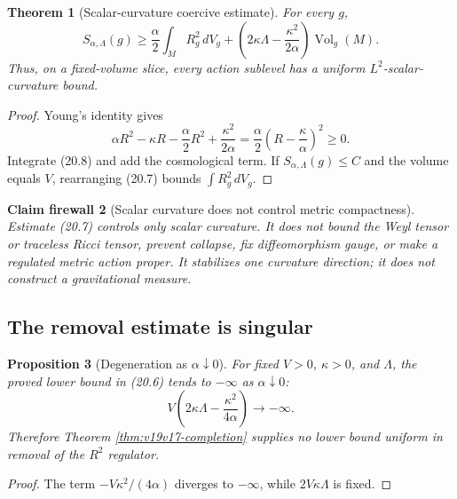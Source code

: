 \documentclass[11pt]{article}
\newtheorem{theorem}{Theorem}[section]
\newtheorem{proposition}[theorem]{Proposition}
\newtheorem{firewall}[theorem]{Claim firewall}
\theoremstyle{remark}
\begin{document}
\begin{theorem}[Scalar-curvature coercive estimate]
\label{thm:v19v17-coercive}
For every \(g\),
\[
 S_{\alpha,\Lambda}(g)
 \geq
 \frac{\alpha}{2}\int_MR_g^2\,dV_g
 +
 \left(2\kappa\Lambda-\frac{\kappa^2}{2\alpha}\right)
 \operatorname{Vol}_g(M).                                     \tag{20.7}
\]
Thus, on a fixed-volume slice, every action sublevel has a uniform
\(L^2\)-scalar-curvature bound.
\end{theorem}

\begin{proof}
Young's identity gives
\[
 \alpha R^2-\kappa R
 -\frac{\alpha}{2}R^2+\frac{\kappa^2}{2\alpha}
 =\frac{\alpha}{2}\left(R-\frac{\kappa}{\alpha}\right)^2
 \geq0.                                                        \tag{20.8}
\]
Integrate (20.8) and add the cosmological term.  If
\(S_{\alpha,\Lambda}(g)\leq C\) and the volume equals \(V\), rearranging
(20.7) bounds \(\int R_g^2\,dV_g\).
\end{proof}

\begin{firewall}[Scalar curvature does not control metric compactness]
\label{fire:v19v17-scalar}
Estimate (20.7) controls only scalar curvature.  It does not bound the Weyl
tensor or traceless Ricci tensor, prevent collapse, fix diffeomorphism
gauge, or make a regulated metric action proper.  It stabilizes one
curvature direction; it does not construct a gravitational measure.
\end{firewall}

\subsection{The removal estimate is singular}

\begin{proposition}[Degeneration as \(\alpha\downarrow0\)]
\label{prop:v19v17-removal}
For fixed \(V>0\), \(\kappa>0\), and \(\Lambda\), the proved lower bound
in (20.6) tends to \(-\infty\) as \(\alpha\downarrow0\):
\[
 V\left(2\kappa\Lambda-\frac{\kappa^2}{4\alpha}\right)
 \longrightarrow-\infty.                                     \tag{20.9}
\]
Therefore Theorem \ref{thm:v19v17-completion} supplies no lower bound
uniform in removal of the \(R^2\) regulator.
\end{proposition}

\begin{proof}
The term \(-V\kappa^2/(4\alpha)\) diverges to \(-\infty\), while
\(2V\kappa\Lambda\) is fixed.
\end{proof}
\end{document}
